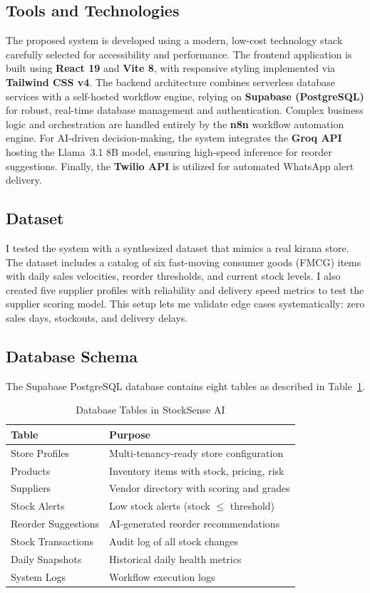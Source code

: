 \documentclass[journal]{IEEEtran}
\begin{document}
\subsection{Tools and Technologies}
The proposed system is developed using a modern, low-cost technology stack carefully selected for accessibility and performance. The frontend application is built using \textbf{React 19} and \textbf{Vite 8}, with responsive styling implemented via \textbf{Tailwind CSS v4}. The backend architecture combines serverless database services with a self-hosted workflow engine, relying on \textbf{Supabase (PostgreSQL)} for robust, real-time database management and authentication. Complex business logic and orchestration are handled entirely by the \textbf{n8n} workflow automation engine. For AI-driven decision-making, the system integrates the \textbf{Groq API} hosting the Llama~3.1 8B model, ensuring high-speed inference for reorder suggestions. Finally, the \textbf{Twilio API} is utilized for automated WhatsApp alert delivery.

\subsection{Dataset}
I tested the system with a synthesized dataset that mimics a real kirana store. The dataset includes a catalog of six fast-moving consumer goods (FMCG) items with daily sales velocities, reorder thresholds, and current stock levels. I also created five supplier profiles with reliability and delivery speed metrics to test the supplier scoring model. This setup lets me validate edge cases systematically: zero sales days, stockouts, and delivery delays.

\subsection{Database Schema}

The Supabase PostgreSQL database contains eight tables as described in Table~\ref{tab:tables}.

\begin{table}[htbp]
\centering
\caption{Database Tables in StockSense AI}
\label{tab:tables}
\begin{tabular}{p{2.2cm}p{5.5cm}}
\toprule
\textbf{Table} & \textbf{Purpose} \\
\midrule
Store Profiles & Multi-tenancy-ready store configuration \\
Products & Inventory items with stock, pricing, risk \\
Suppliers & Vendor directory with scoring and grades \\
Stock Alerts & Low stock alerts (stock $\leq$ threshold) \\
Reorder Suggestions & AI-generated reorder recommendations \\
Stock Transactions & Audit log of all stock changes \\
Daily Snapshots & Historical daily health metrics \\
System Logs & Workflow execution logs \\
\bottomrule
\end{tabular}
\end{table}
\end{document}
